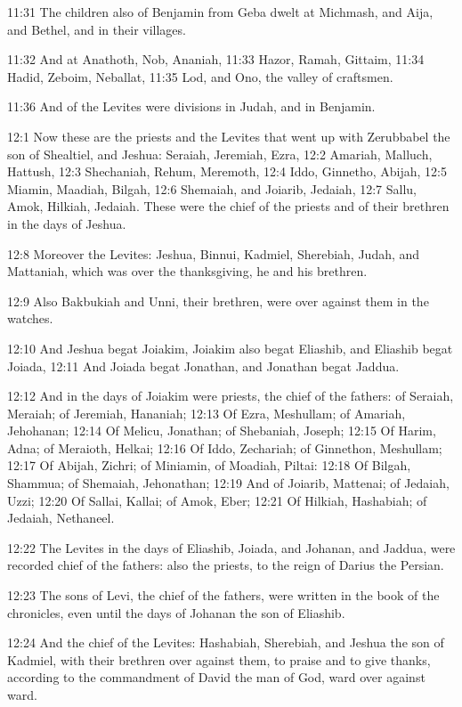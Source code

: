 11:31 The children also of Benjamin from Geba dwelt at Michmash, and Aija, and Bethel, and in their villages.

11:32 And at Anathoth, Nob, Ananiah, 11:33 Hazor, Ramah, Gittaim, 11:34 Hadid, Zeboim, Neballat, 11:35 Lod, and Ono, the valley of craftsmen.

11:36 And of the Levites were divisions in Judah, and in Benjamin.

12:1 Now these are the priests and the Levites that went up with Zerubbabel the son of Shealtiel, and Jeshua: Seraiah, Jeremiah, Ezra, 12:2 Amariah, Malluch, Hattush, 12:3 Shechaniah, Rehum, Meremoth, 12:4 Iddo, Ginnetho, Abijah, 12:5 Miamin, Maadiah, Bilgah, 12:6 Shemaiah, and Joiarib, Jedaiah, 12:7 Sallu, Amok, Hilkiah, Jedaiah. These were the chief of the priests and of their brethren in the days of Jeshua.

12:8 Moreover the Levites: Jeshua, Binnui, Kadmiel, Sherebiah, Judah, and Mattaniah, which was over the thanksgiving, he and his brethren.

12:9 Also Bakbukiah and Unni, their brethren, were over against them in the watches.

12:10 And Jeshua begat Joiakim, Joiakim also begat Eliashib, and Eliashib begat Joiada, 12:11 And Joiada begat Jonathan, and Jonathan begat Jaddua.

12:12 And in the days of Joiakim were priests, the chief of the fathers: of Seraiah, Meraiah; of Jeremiah, Hananiah; 12:13 Of Ezra, Meshullam; of Amariah, Jehohanan; 12:14 Of Melicu, Jonathan; of Shebaniah, Joseph; 12:15 Of Harim, Adna; of Meraioth, Helkai; 12:16 Of Iddo, Zechariah; of Ginnethon, Meshullam; 12:17 Of Abijah, Zichri; of Miniamin, of Moadiah, Piltai: 12:18 Of Bilgah, Shammua; of Shemaiah, Jehonathan; 12:19 And of Joiarib, Mattenai; of Jedaiah, Uzzi; 12:20 Of Sallai, Kallai; of Amok, Eber; 12:21 Of Hilkiah, Hashabiah; of Jedaiah, Nethaneel.

12:22 The Levites in the days of Eliashib, Joiada, and Johanan, and Jaddua, were recorded chief of the fathers: also the priests, to the reign of Darius the Persian.

12:23 The sons of Levi, the chief of the fathers, were written in the book of the chronicles, even until the days of Johanan the son of Eliashib.

12:24 And the chief of the Levites: Hashabiah, Sherebiah, and Jeshua the son of Kadmiel, with their brethren over against them, to praise and to give thanks, according to the commandment of David the man of God, ward over against ward.

